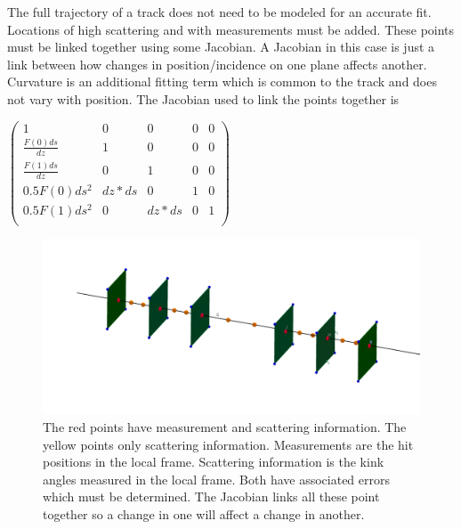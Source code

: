 The full trajectory of a track does not need to be modeled for an accurate fit. Locations of high scattering and with measurements must be added. These points must be linked together using some Jacobian. A Jacobian in this case is just a link between how changes in position/incidence on one plane affects another. Curvature is an additional fitting term which is common to the track and does not vary with position. The Jacobian used to link the points together is 


\begin{center}
$
 \left( \begin{array}{cccccc}
1                            & 0       & 0        & 0 & 0  \\
\frac{F(0)ds}{dz} & 1        & 0        & 0 & 0  \\
\frac{F(1)ds}{dz} & 0        & 1        & 0 & 0  \\
0.5F(0)ds^2        & dz*ds & 0        & 1 & 0      \\  
0.5F(1)ds^2        & 0        & dz*ds & 0 &  1       \\  
  \label{eq:PC}
\end{array}
 \right)
$
\end{center}

\begin{figure}[H]
\centering
\includegraphics[width=1.0\linewidth]{figures/meas-scat-jac-link.png}
\caption{The red points have measurement and scattering information. The yellow points only scattering information. Measurements are the hit positions in the local frame. Scattering information is the kink angles measured in the local frame. Both have associated errors which must be determined. The Jacobian links all these point together so a change in one will affect a change in another.}
\label{fig:LinkJac}
\end{figure}



